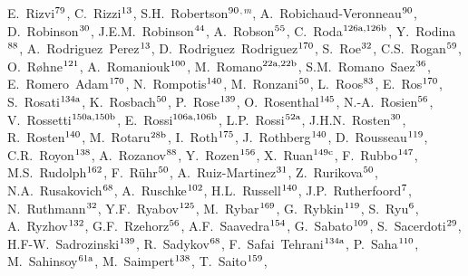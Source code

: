\begin{flushleft}
E.~Rizvi$^\textrm{\scriptsize 79}$,
C.~Rizzi$^\textrm{\scriptsize 13}$,
S.H.~Robertson$^\textrm{\scriptsize 90}$$^{,m}$,
A.~Robichaud-Veronneau$^\textrm{\scriptsize 90}$,
D.~Robinson$^\textrm{\scriptsize 30}$,
J.E.M.~Robinson$^\textrm{\scriptsize 44}$,
A.~Robson$^\textrm{\scriptsize 55}$,
C.~Roda$^\textrm{\scriptsize 126a,126b}$,
Y.~Rodina$^\textrm{\scriptsize 88}$,
A.~Rodriguez~Perez$^\textrm{\scriptsize 13}$,
D.~Rodriguez~Rodriguez$^\textrm{\scriptsize 170}$,
S.~Roe$^\textrm{\scriptsize 32}$,
C.S.~Rogan$^\textrm{\scriptsize 59}$,
O.~R{\o}hne$^\textrm{\scriptsize 121}$,
A.~Romaniouk$^\textrm{\scriptsize 100}$,
M.~Romano$^\textrm{\scriptsize 22a,22b}$,
S.M.~Romano~Saez$^\textrm{\scriptsize 36}$,
E.~Romero~Adam$^\textrm{\scriptsize 170}$,
N.~Rompotis$^\textrm{\scriptsize 140}$,
M.~Ronzani$^\textrm{\scriptsize 50}$,
L.~Roos$^\textrm{\scriptsize 83}$,
E.~Ros$^\textrm{\scriptsize 170}$,
S.~Rosati$^\textrm{\scriptsize 134a}$,
K.~Rosbach$^\textrm{\scriptsize 50}$,
P.~Rose$^\textrm{\scriptsize 139}$,
O.~Rosenthal$^\textrm{\scriptsize 145}$,
N.-A.~Rosien$^\textrm{\scriptsize 56}$,
V.~Rossetti$^\textrm{\scriptsize 150a,150b}$,
E.~Rossi$^\textrm{\scriptsize 106a,106b}$,
L.P.~Rossi$^\textrm{\scriptsize 52a}$,
J.H.N.~Rosten$^\textrm{\scriptsize 30}$,
R.~Rosten$^\textrm{\scriptsize 140}$,
M.~Rotaru$^\textrm{\scriptsize 28b}$,
I.~Roth$^\textrm{\scriptsize 175}$,
J.~Rothberg$^\textrm{\scriptsize 140}$,
D.~Rousseau$^\textrm{\scriptsize 119}$,
C.R.~Royon$^\textrm{\scriptsize 138}$,
A.~Rozanov$^\textrm{\scriptsize 88}$,
Y.~Rozen$^\textrm{\scriptsize 156}$,
X.~Ruan$^\textrm{\scriptsize 149c}$,
F.~Rubbo$^\textrm{\scriptsize 147}$,
M.S.~Rudolph$^\textrm{\scriptsize 162}$,
F.~R\"uhr$^\textrm{\scriptsize 50}$,
A.~Ruiz-Martinez$^\textrm{\scriptsize 31}$,
Z.~Rurikova$^\textrm{\scriptsize 50}$,
N.A.~Rusakovich$^\textrm{\scriptsize 68}$,
A.~Ruschke$^\textrm{\scriptsize 102}$,
H.L.~Russell$^\textrm{\scriptsize 140}$,
J.P.~Rutherfoord$^\textrm{\scriptsize 7}$,
N.~Ruthmann$^\textrm{\scriptsize 32}$,
Y.F.~Ryabov$^\textrm{\scriptsize 125}$,
M.~Rybar$^\textrm{\scriptsize 169}$,
G.~Rybkin$^\textrm{\scriptsize 119}$,
S.~Ryu$^\textrm{\scriptsize 6}$,
A.~Ryzhov$^\textrm{\scriptsize 132}$,
G.F.~Rzehorz$^\textrm{\scriptsize 56}$,
A.F.~Saavedra$^\textrm{\scriptsize 154}$,
G.~Sabato$^\textrm{\scriptsize 109}$,
S.~Sacerdoti$^\textrm{\scriptsize 29}$,
H.F-W.~Sadrozinski$^\textrm{\scriptsize 139}$,
R.~Sadykov$^\textrm{\scriptsize 68}$,
F.~Safai~Tehrani$^\textrm{\scriptsize 134a}$,
P.~Saha$^\textrm{\scriptsize 110}$,
M.~Sahinsoy$^\textrm{\scriptsize 61a}$,
M.~Saimpert$^\textrm{\scriptsize 138}$,
T.~Saito$^\textrm{\scriptsize 159}$,
$$
\end{flushleft}
